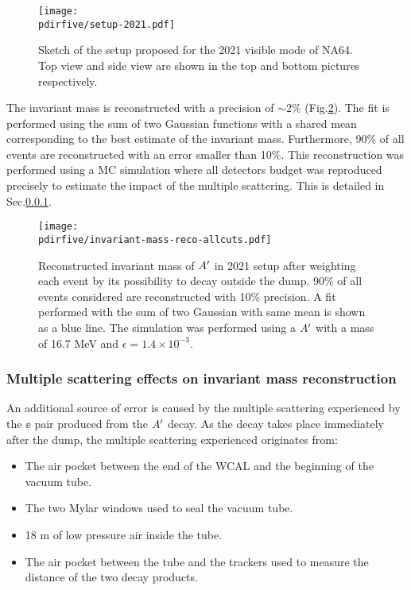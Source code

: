 \begin{figure}[tbh!]
  \centering
  \texttt{[image: \\pdirfive/setup-2021.pdf]}
  \caption[2021 setup]{Sketch of the setup proposed for the 2021 visible mode of NA64. Top view and side view are shown in the top and bottom pictures respectively.}
  \label{fig:setup-2021}
\end{figure}

The invariant mass is reconstructed with a precision of $\sim$2\% (Fig.\ref{fig:imassreco}). The fit is performed using the sum of two Gaussian functions with a shared mean corresponding to the best estimate of the invariant mass. Furthermore, 90\% of all events are reconstructed with an error smaller than 10\%. This reconstruction was performed using a MC simulation where all detectors budget was reproduced precisely to estimate the impact of the multiple scattering. This is detailed in Sec.\ref{ch5:sec:mm-scattering}.


\begin{figure}[tbh!]
  \centering
  \texttt{[image: \\pdirfive/invariant-mass-reco-allcuts.pdf]}
  \caption[Invariant mass reconstruction in 2021 setup]{Reconstructed invariant mass of $A'$ in 2021 setup after weighting each event by its possibility to decay outside the dump. 90\% of all events considered are reconstructed with 10\% precision. A fit performed with the sum of two Gaussian with same mean is shown as a blue line. The simulation was performed using a $A'$ with a mass of 16.7 MeV and $\epsilon = 1.4\times10^{-3}$.}
    \label{fig:imassreco}
  \end{figure}

\subsubsection{Multiple scattering effects on invariant mass reconstruction}
\label{ch5:sec:mm-scattering}

An additional source of error is caused by the multiple scattering experienced by the $\ee$ pair produced from the $A'$ decay. As the decay takes place immediately after the dump, the multiple scattering experienced originates from:

\begin{itemize}
\item The air pocket between the end of the WCAL and the beginning of the vacuum tube.
\item The two Mylar windows used to seal the vacuum tube.
\item 18 m of low pressure air inside the tube.
\item The air pocket between the tube and the trackers used to measure the distance of the two decay products.
\end{itemize}

